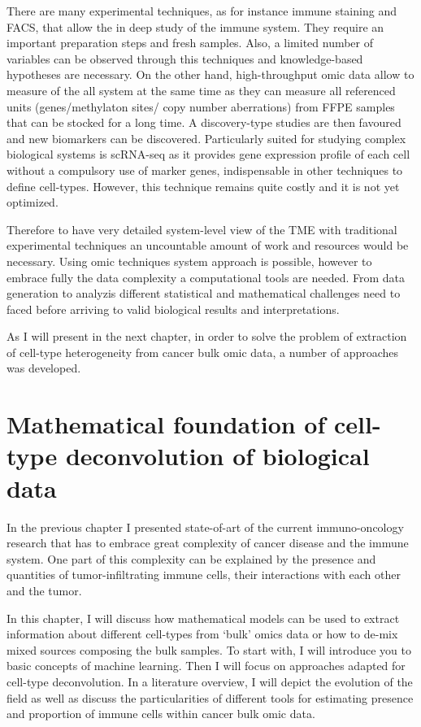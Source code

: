 \documentclass[12pt,]{book}
\theoremstyle{definition}
\theoremstyle{definition}
\theoremstyle{definition}
\theoremstyle{remark}
\begin{document}
There are many experimental techniques, as for instance immune staining
and FACS, that allow the in deep study of the immune system. They
require an important preparation steps and fresh samples. Also, a
limited number of variables can be observed through this techniques and
knowledge-based hypotheses are necessary. On the other hand,
high-throughput omic data allow to measure of the all system at the same
time as they can measure all referenced units (genes/methylaton sites/
copy number aberrations) from FFPE samples that can be stocked for a
long time. A discovery-type studies are then favoured and new biomarkers
can be discovered. Particularly suited for studying complex biological
systems is scRNA-seq as it provides gene expression profile of each cell
without a compulsory use of marker genes, indispensable in other
techniques to define cell-types. However, this technique remains quite
costly and it is not yet optimized.

Therefore to have very detailed system-level view of the TME with
traditional experimental techniques an uncountable amount of work and
resources would be necessary. Using omic techniques system approach is
possible, however to embrace fully the data complexity a computational
tools are needed. From data generation to analyzis different statistical
and mathematical challenges need to faced before arriving to valid
biological results and interpretations.

As I will present in the next chapter, in order to solve the problem of
extraction of cell-type heterogeneity from cancer bulk omic data, a
number of approaches was developed.

\hypertarget{methods}{%
\chapter{Mathematical foundation of cell-type deconvolution of
biological data}\label{methods}}


In the previous chapter I presented state-of-art of the current
immuno-oncology research that has to embrace great complexity of cancer
disease and the immune system. One part of this complexity can be
explained by the presence and quantities of tumor-infiltrating immune
cells, their interactions with each other and the tumor.

In this chapter, I will discuss how mathematical models can be used to
extract information about different cell-types from `bulk' omics data or
how to de-mix mixed sources composing the bulk samples. To start with, I
will introduce you to basic concepts of machine learning. Then I will
focus on approaches adapted for cell-type deconvolution. In a literature
overview, I will depict the evolution of the field as well as discuss
the particularities of different tools for estimating presence and
proportion of immune cells within cancer bulk omic data.
\end{document}
